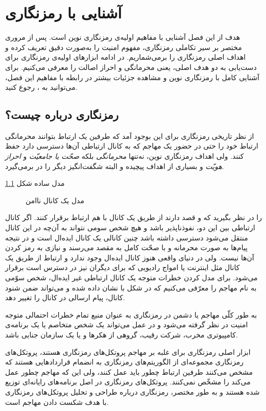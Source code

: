 \chapter{آشنایی با رمزنگاری}
هدف از این فصل آشنایی با مفاهیم اولیه‌ی رمزنگاری نوین است. پس از مروری مختصر بر سیر تکاملی رمزنگاری، مفهوم امنیت را به‌صورت دقیق تعریف کرده و اهداف اصلی رمزنگاری را برمی‌شماریم. در ادامه ابزارهای اولیه‌ی رمزنگاری برای دست‌یابی به دو هدف اصلی، یعنی محرمانگی و احراز اصالت را معرفی می‌کنیم. برای آشنایی کامل با رمزنگاری نوین و مشاهده‌ جزئیات بیشتر در رابطه با مفاهیم این فصل، می‌توانید به 
\cite{katz2014introduction}،
رجوع کنید.

\section{رمزنگاری درباره‌ چیست؟}
از نظر تاریخی رمزنگاری برای این بوجود آمد که طرفین یک ارتباط بتوانند محرمانگی ارتباط خود را حتی در حضور یک مهاجم که به کانال ارتباطی آن‌ها دسترسی دارد حفظ کنند.  ولی اهداف رمزنگاری نوین، نه‌تنها
\textit{ محرمانگی }
بلکه 
\textit{صحّت یا جامعیّت}
و 
\textit{احراز هویّت}
و بسیاری از اهداف پیچیده و البته شگفت‌‌انگیز دیگر را در برمی‌گیرد.


مدل ساده شکل 
\ref{fig:canal}
\begin{figure}[h]
\begin{center}

\end{center}
\caption{مدل یک کانال ناامن\cite{TikZ:for:Cryptographers}}
\label{fig:canal}
\end{figure}
را در نظر بگیرید که 
و
قصد دارند از طریق یک کانال با هم ارتباط برقرار کنند. اگر کانال ارتباطی بین این دو، نفوذناپذیر باشد و هیچ شخص سومی نتواند به آن‌چه در این کانال منتقل می‌شود دسترسی داشته باشد چنین کانالی یک کانال ایده‌ال است و در نتیجه پیام‌ها به صورت محرمانه و با صحّت کامل به مقصد می‌رسند و نیازی به رمز کردن آن‌ها نیست. ولی در دنیای واقعی  هنوز کانال ایده‌ال وجود ندارد و ارتباط از طریق یک کانال  مثل اینترنت  یا امواج رادیویی که برای دیگران نیز در دسترس است برقرار می‌شود. برای مدل کردن خطرات متوجه  یک کانال ارتباطی غیر ایده‌ال، شخص سوّمی به نام مهاجم
را معرّفی می‌کنیم که در شکل با
نشان داده شده و می‌تواند ضمن شنود کانال، پیام ارسالی در کانال را تغییر دهد. 

به طور کلّی مهاجم یا دشمن در رمزنگاری به عنوان منبع تمام خطرات احتمالی متوجه  امنیت در نظر گرفته می‌شود و در عمل می‌تواند یک شخص متخاصم یا یک برنامه‌ی کامپیوتری مخرب، شرکت رقیب، گروهی از هکرها و یا یک سازمان جنایی باشد. 

ابزار اصلی رمزنگاری برای غلبه بر مهاجم پروتکل‌های رمزنگاری هستند، پروتکل‌های رمزنگاری مجموعه‌ای از الگوریتم‌های رمزنگاری به انضمام قراردادهایی هستند که مشخص می‌کنند طرفین ارتباط چطور باید عمل کنند، ولی این که مهاجم چطور عمل می‌کند را مشخّص نمی‌کنند. پروتکل‌های رمزنگاری در اصل برنامه‌های رایانه‌ای توزیع شده
هستند و به طور مختصر، رمزنگاری درباره طراحی  و تحلیل پروتکل‌های رمزنگاری با هدف شکست دادن مهاجم است. 

